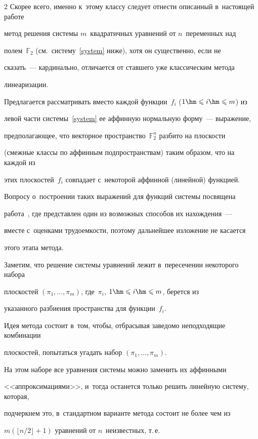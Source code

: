 \begin{multicols}{2}
Скорее всего, именно к~этому классу следует отнести описанный в~настоящей работе 


метод решения системы $m$~квадратичных уравнений от $n$~переменных над 


полем~$\mathbb{F}_2$ (см.\ систему~\eqref{system} ниже), хотя он существенно, если не 


сказать~--- кардинально, отличается от ставшего уже классическим метода 


линеаризации.





Предлагается рассматривать вместо каждой функции~$f_i$ ($1\hm\leqslant i\hm\leqslant m$) из 


левой части системы~\eqref{system} ее аффинную нормальную форму~--- выражение, 


предполагающее, что векторное пространство~$\mathbb{F}_2^n$ разбито на плоскости 


(смежные классы по аффинным подпространствам) таким образом, что на каждой из 


этих плоскостей~$f_i$ совпадает с~некоторой аффинной (линейной) функцией.


Вопросу о~построении таких выражений для функций сис\-те\-мы посвящена 


работа~\cite{LSF2019}, где представлен один из возможных способов их нахождения~--- 


вместе с~оценками трудоемкости, поэтому дальнейшее изложение не касается 


этого этапа метода.


Заметим, что решение сис\-те\-мы уравнений лежит в~пересечении некоторого набора 


плоскостей $(\pi_1,\ldots,\pi_m)$, где~$\pi_i$, $1\hm\leqslant i\hm\leqslant m$, берется из 


указанного разбиения пространства для функции~$f_i$.


Идея метода со\-сто\-ит в~том, чтобы, отбрасывая заведомо неподходящие комбинации 


плоскостей, попытаться угадать набор $(\pi_1,\ldots,\pi_m)$.


На этом наборе все уравнения сис\-те\-мы можно заменить их аффинными 


<<аппроксимациями>>, и~тогда останется только решить линейную сис\-те\-му, которая, 


подчеркнем это, в~стандартном варианте метода со\-сто\-ит не более чем из 


$m(\lfloor{n}/{2}\rfloor+1)$ уравнений от $n$~неизвестных, т.\,е.\ 



\end{multicols}
